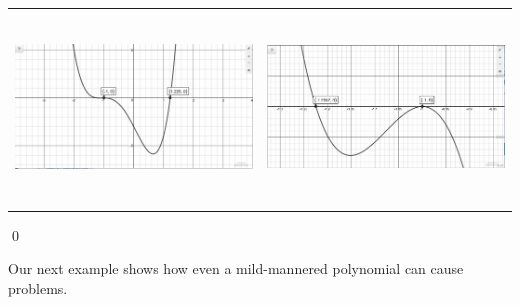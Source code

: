 \begin{ex}
\begin{center}
\begin{tabular}{cc}
\includegraphics[width = 3in, height=2in]{./RealZerosGraphics/RealZerosEx01a.jpg}  &\includegraphics[width = 3in, height=2in]{./RealZerosGraphics/RealZerosEx01b.jpg}

\end{tabular}
\end{center}

 \qed

\end{ex}


Our next example shows how even a mild-mannered polynomial can cause problems.

